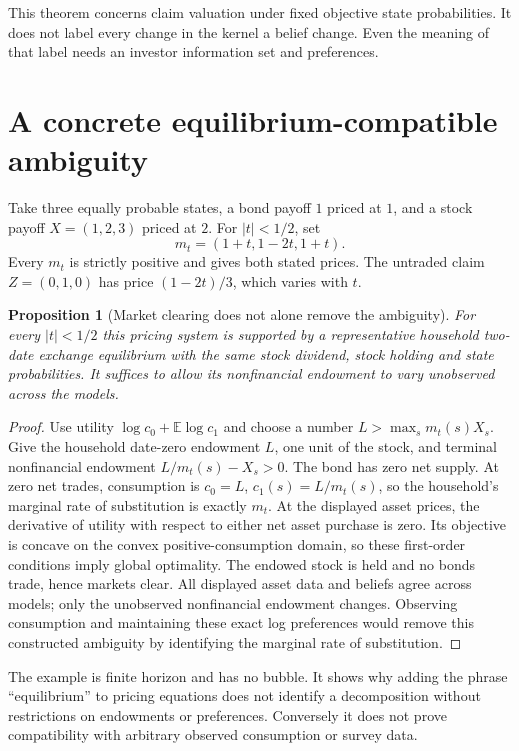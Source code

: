 \documentclass[11pt]{article}
\newtheorem{proposition}[theorem]{Proposition}
\theoremstyle{definition}
\begin{document}
This theorem concerns claim valuation under fixed objective state probabilities.
It does not label every change in the kernel a belief change. Even the
meaning of that label needs an investor information set and preferences.

\section*{A concrete equilibrium-compatible ambiguity}
Take three equally probable states, a bond payoff $1$ priced at $1$, and a
stock payoff $X=(1,2,3)$ priced at $2$. For $|t|<1/2$, set
\[
 m_t=(1+t,1-2t,1+t).
\]
Every $m_t$ is strictly positive and gives both stated prices. The untraded
claim $Z=(0,1,0)$ has price $(1-2t)/3$, which varies with $t$.

\begin{proposition}[Market clearing does not alone remove the ambiguity]
For every $|t|<1/2$ this pricing system is supported by a representative
household two-date exchange equilibrium with the same stock dividend,
stock holding and state probabilities. It suffices to allow its nonfinancial
endowment to vary unobserved across the models.
\end{proposition}
\begin{proof}
Use utility $\log c_0+\mathbb E\log c_1$ and choose a number
$L>\max_s m_t(s)X_s$. Give the household date-zero endowment $L$,
one unit of the stock, and terminal nonfinancial endowment
$L/m_t(s)-X_s>0$. The bond has zero net supply. At zero net trades,
consumption is $c_0=L$, $c_1(s)=L/m_t(s)$, so the household's marginal
rate of substitution is exactly $m_t$. At the displayed asset prices,
the derivative of utility with respect to either net asset purchase is
zero. Its objective is concave on the convex positive-consumption domain,
so these first-order conditions imply global optimality. The endowed stock
is held and no bonds trade, hence markets clear. All displayed asset data
and beliefs agree across models; only the unobserved nonfinancial endowment
changes. Observing consumption and maintaining these exact log preferences
would remove this constructed ambiguity by identifying the marginal rate
of substitution.
\end{proof}

The example is finite horizon and has no bubble. It shows why adding the
phrase ``equilibrium'' to pricing equations does not identify a decomposition
without restrictions on endowments or preferences. Conversely it does not
prove compatibility with arbitrary observed consumption or survey data.
\end{document}
